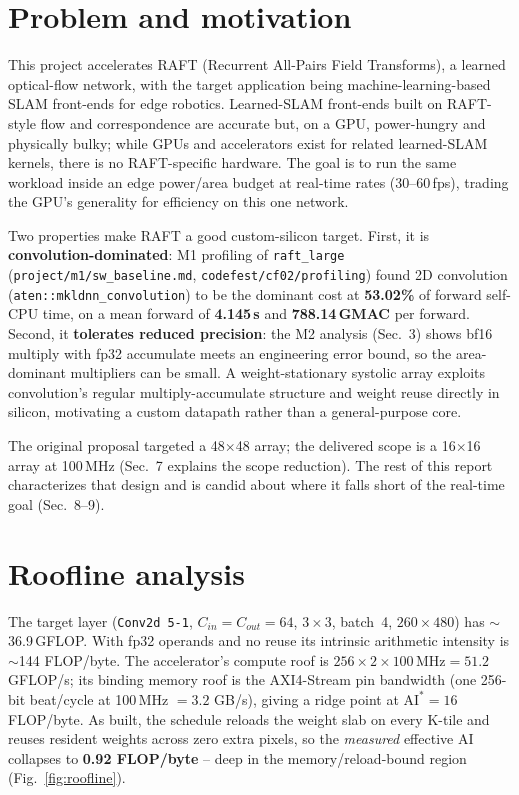 \documentclass[11pt]{article}
\begin{document}
\section{Problem and motivation}
This project accelerates RAFT (Recurrent All-Pairs Field Transforms), a
learned optical-flow network, with the target application being
machine-learning-based SLAM front-ends for edge robotics. Learned-SLAM
front-ends built on RAFT-style flow and correspondence are accurate but, on a
GPU, power-hungry and physically bulky; while GPUs and accelerators exist for
related learned-SLAM kernels, there is no RAFT-specific hardware. The goal is
to run the same workload inside an edge power/area budget at real-time rates
(30--60\,fps), trading the GPU's generality for efficiency on this one network.

Two properties make RAFT a good custom-silicon target. First, it is
\textbf{convolution-dominated}: M1 profiling of \texttt{raft\_large}
(\texttt{project/m1/sw\_baseline.md}, \texttt{codefest/cf02/profiling}) found
2D convolution (\texttt{aten::mkldnn\_convolution}) to be the dominant cost at
\textbf{53.02\%} of forward self-CPU time, on a mean forward of
\textbf{4.145\,s} and \textbf{788.14\,GMAC} per forward. Second, it
\textbf{tolerates reduced precision}: the M2 analysis (Sec.~3) shows bf16
multiply with fp32 accumulate meets an engineering error bound, so the
area-dominant multipliers can be small. A weight-stationary systolic array
exploits convolution's regular multiply-accumulate structure and weight reuse
directly in silicon, motivating a custom datapath rather than a
general-purpose core.

The original proposal targeted a 48$\times$48 array; the delivered scope is a
16$\times$16 array at 100\,MHz (Sec.~7 explains the scope reduction). The rest
of this report characterizes that design and is candid about where it falls
short of the real-time goal (Sec.~8--9).

\section{Roofline analysis}
The target layer (\texttt{Conv2d 5-1}, \(C_{in}{=}C_{out}{=}64\), \(3\times3\),
batch~4, \(260\times480\)) has \(\sim\)36.9\,GFLOP. With fp32 operands and no
reuse its intrinsic arithmetic intensity is \(\sim\)144 FLOP/byte. The
accelerator's compute roof is \(256\times2\times100\,\text{MHz}=51.2\)
GFLOP/s; its binding memory roof is the AXI4-Stream pin bandwidth
(one 256-bit beat/cycle at 100\,MHz \(=3.2\) GB/s), giving a ridge point at
\(\text{AI}^{*}=16\) FLOP/byte. As built, the schedule reloads the weight
slab on every K-tile and reuses resident weights across zero extra pixels, so
the \emph{measured} effective AI collapses to \textbf{0.92 FLOP/byte} --
deep in the memory/reload-bound region (Fig.~\ref{fig:roofline}).
\end{document}
